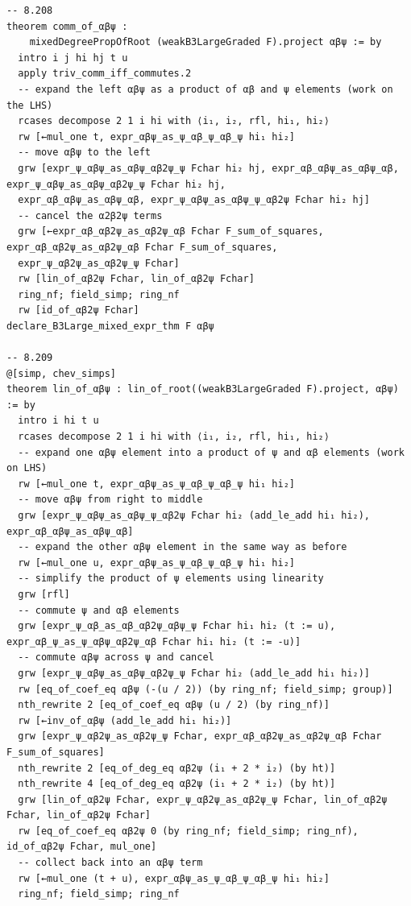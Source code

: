 \begin{Verbatim}
-- 8.208
theorem comm_of_αβψ :
    mixedDegreePropOfRoot (weakB3LargeGraded F).project αβψ := by
  intro i j hi hj t u
  apply triv_comm_iff_commutes.2
  -- expand the left αβψ as a product of αβ and ψ elements (work on the LHS)
  rcases decompose 2 1 i hi with ⟨i₁, i₂, rfl, hi₁, hi₂⟩
  rw [←mul_one t, expr_αβψ_as_ψ_αβ_ψ_αβ_ψ hi₁ hi₂]
  -- move αβψ to the left
  grw [expr_ψ_αβψ_as_αβψ_αβ2ψ_ψ Fchar hi₂ hj, expr_αβ_αβψ_as_αβψ_αβ, expr_ψ_αβψ_as_αβψ_αβ2ψ_ψ Fchar hi₂ hj,
  expr_αβ_αβψ_as_αβψ_αβ, expr_ψ_αβψ_as_αβψ_ψ_αβ2ψ Fchar hi₂ hj]
  -- cancel the α2β2ψ terms
  grw [←expr_αβ_αβ2ψ_as_αβ2ψ_αβ Fchar F_sum_of_squares, expr_αβ_αβ2ψ_as_αβ2ψ_αβ Fchar F_sum_of_squares,
  expr_ψ_αβ2ψ_as_αβ2ψ_ψ Fchar]
  rw [lin_of_αβ2ψ Fchar, lin_of_αβ2ψ Fchar]
  ring_nf; field_simp; ring_nf
  rw [id_of_αβ2ψ Fchar]
declare_B3Large_mixed_expr_thm F αβψ

-- 8.209
@[simp, chev_simps]
theorem lin_of_αβψ : lin_of_root((weakB3LargeGraded F).project, αβψ) := by
  intro i hi t u
  rcases decompose 2 1 i hi with ⟨i₁, i₂, rfl, hi₁, hi₂⟩
  -- expand one αβψ element into a product of ψ and αβ elements (work on LHS)
  rw [←mul_one t, expr_αβψ_as_ψ_αβ_ψ_αβ_ψ hi₁ hi₂]
  -- move αβψ from right to middle
  grw [expr_ψ_αβψ_as_αβψ_ψ_αβ2ψ Fchar hi₂ (add_le_add hi₁ hi₂), expr_αβ_αβψ_as_αβψ_αβ]
  -- expand the other αβψ element in the same way as before
  rw [←mul_one u, expr_αβψ_as_ψ_αβ_ψ_αβ_ψ hi₁ hi₂]
  -- simplify the product of ψ elements using linearity
  grw [rfl]
  -- commute ψ and αβ elements
  grw [expr_ψ_αβ_as_αβ_αβ2ψ_αβψ_ψ Fchar hi₁ hi₂ (t := u), expr_αβ_ψ_as_ψ_αβψ_αβ2ψ_αβ Fchar hi₁ hi₂ (t := -u)]
  -- commute αβψ across ψ and cancel
  grw [expr_ψ_αβψ_as_αβψ_αβ2ψ_ψ Fchar hi₂ (add_le_add hi₁ hi₂)]
  rw [eq_of_coef_eq αβψ (-(u / 2)) (by ring_nf; field_simp; group)]
  nth_rewrite 2 [eq_of_coef_eq αβψ (u / 2) (by ring_nf)]
  rw [←inv_of_αβψ (add_le_add hi₁ hi₂)]
  grw [expr_ψ_αβ2ψ_as_αβ2ψ_ψ Fchar, expr_αβ_αβ2ψ_as_αβ2ψ_αβ Fchar F_sum_of_squares]
  nth_rewrite 2 [eq_of_deg_eq αβ2ψ (i₁ + 2 * i₂) (by ht)]
  nth_rewrite 4 [eq_of_deg_eq αβ2ψ (i₁ + 2 * i₂) (by ht)]
  grw [lin_of_αβ2ψ Fchar, expr_ψ_αβ2ψ_as_αβ2ψ_ψ Fchar, lin_of_αβ2ψ Fchar, lin_of_αβ2ψ Fchar]
  rw [eq_of_coef_eq αβ2ψ 0 (by ring_nf; field_simp; ring_nf), id_of_αβ2ψ Fchar, mul_one]
  -- collect back into an αβψ term
  rw [←mul_one (t + u), expr_αβψ_as_ψ_αβ_ψ_αβ_ψ hi₁ hi₂]
  ring_nf; field_simp; ring_nf


\end{Verbatim}
